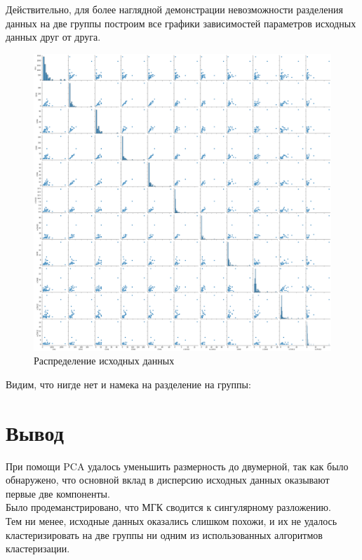 \documentclass[a4]{article}
\begin{document}
	Действительно, для более наглядной демонстрации невозможности разделения данных на две группы построим все графики зависимостей параметров исходных данных друг от друга.\\
	\begin{figure}[h!]
		\includegraphics[width=\textwidth]{data_disp.png}\caption[Распределение исходных данных]{Распределение исходных данных}
	\end{figure} 
	Видим, что нигде нет и намека на разделение на группы:\\
	
	\newpage
	\section{Вывод}
	
	При помощи PCA удалось уменьшить размерность до двумерной, так как было обнаружено, что основной вклад в дисперсию исходных данных оказывают первые две компоненты. \\
	
	Было продеманстрировано, что МГК сводится к сингулярному разложению. \\
	
	Тем ни менее, исходные данных оказались слишком похожи, и их не удалось кластеризировать на две группы ни одним из использованных алгоритмов кластеризации.
\end{document}
